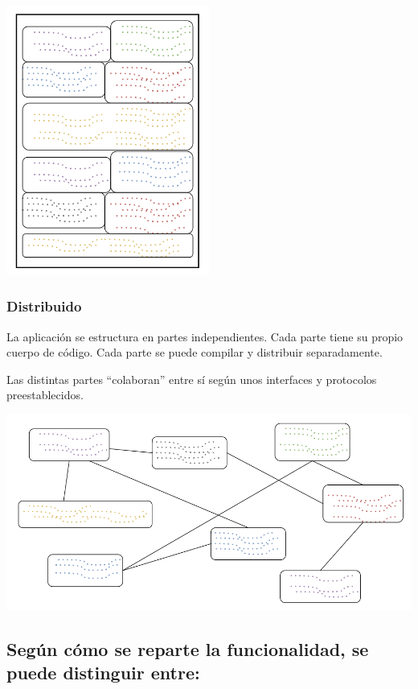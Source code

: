 \documentclass[spanish,12pt,a4paper,final,oneside]{book}
\begin{document}
\begin{center}
\includegraphics[width=0.5\textwidth]{arquitectura - monolito}
\end{center}

\subsubsection{Distribuido}

La aplicación se estructura en partes independientes. Cada parte tiene su propio cuerpo de código. Cada parte se puede compilar y distribuir separadamente.

Las distintas partes ``colaboran'' entre sí según unos interfaces y protocolos preestablecidos.

\includegraphics[width=\textwidth]{arquitectura - distribuido}



\subsection{Según cómo se reparte la funcionalidad, se puede distinguir entre:}
\end{document}
